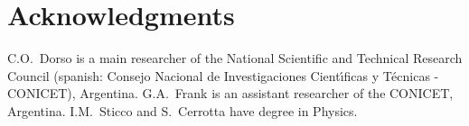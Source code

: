 \section{\label{acknowledgments}Acknowledgments}

C.O.~Dorso is a main researcher of the National Scientific and Technical 
Research Council (spanish: Consejo Nacional de Investigaciones Cient\'\i ficas y 
T\'ecnicas - CONICET), Argentina. G.A.~Frank is an assistant researcher of the 
CONICET, Argentina. I.M.~Sticco and S.~Cerrotta have degree in Physics.
